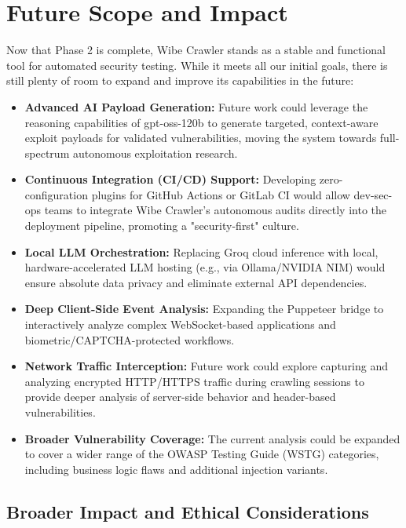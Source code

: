 \documentclass[12pt,oneside,a4paper]{book}
\begin{document}
\chapter{Future Scope and Impact}
\label{chap:futurescope}

Now that Phase 2 is complete, Wibe Crawler stands as a stable and functional tool for automated security testing. While it meets all our initial goals, there is still plenty of room to expand and improve its capabilities in the future:

\begin{itemize}
  \item \textbf{Advanced AI Payload Generation:} Future work could leverage the reasoning capabilities of gpt-oss-120b to generate targeted, context-aware exploit payloads for validated vulnerabilities, moving the system towards full-spectrum autonomous exploitation research.
  \item \textbf{Continuous Integration (CI/CD) Support:} Developing zero-configuration plugins for GitHub Actions or GitLab CI would allow dev-sec-ops teams to integrate Wibe Crawler's autonomous audits directly into the deployment pipeline, promoting a "security-first" culture.
  \item \textbf{Local LLM Orchestration:} Replacing Groq cloud inference with local, hardware-accelerated LLM hosting (e.g., via Ollama/NVIDIA NIM) would ensure absolute data privacy and eliminate external API dependencies.
  \item \textbf{Deep Client-Side Event Analysis:} Expanding the Puppeteer bridge to interactively analyze complex WebSocket-based applications and biometric/CAPTCHA-protected workflows.
  \item \textbf{Network Traffic Interception:} Future work could explore capturing and analyzing encrypted HTTP/HTTPS traffic during crawling sessions to provide deeper analysis of server-side behavior and header-based vulnerabilities.
  \item \textbf{Broader Vulnerability Coverage:} The current analysis could be expanded to cover a wider range of the OWASP Testing Guide (WSTG) categories, including business logic flaws and additional injection variants.
\end{itemize}

\section{Broader Impact and Ethical Considerations}
\end{document}
